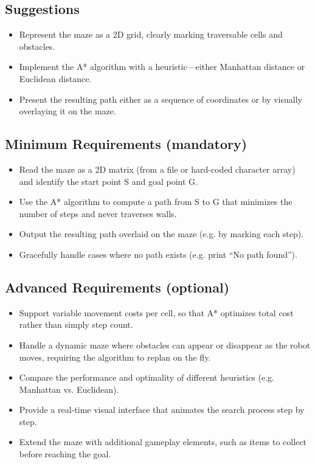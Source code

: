 \documentclass[a4paper,12pt]{article}
\begin{document}
\subsection*{Suggestions}
\begin{itemize}[noitemsep]
  \item Represent the maze as a 2D grid, clearly marking traversable cells and obstacles.
  \item Implement the A* algorithm with a heuristic—either Manhattan distance or Euclidean distance.
  \item Present the resulting path either as a sequence of coordinates or by visually overlaying it on the maze.
\end{itemize}

\subsection*{Minimum Requirements (mandatory)}
\begin{itemize}[noitemsep]
  \item Read the maze as a 2D matrix (from a file or hard-coded character array) and identify the start point S and goal point G.
  \item Use the A* algorithm to compute a path from S to G that minimizes the number of steps and never traverses walls.
  \item Output the resulting path overlaid on the maze (e.g. by marking each step).
  \item Gracefully handle cases where no path exists (e.g. print “No path found”).
\end{itemize}

\subsection*{Advanced Requirements (optional)}
\begin{itemize}[noitemsep]
  \item Support variable movement costs per cell, so that A* optimizes total cost rather than simply step count.
  \item Handle a dynamic maze where obstacles can appear or disappear as the robot moves, requiring the algorithm to replan on the fly.
  \item Compare the performance and optimality of different heuristics (e.g. Manhattan vs. Euclidean).
  \item Provide a real-time visual interface that animates the search process step by step.
  \item Extend the maze with additional gameplay elements, such as items to collect before reaching the goal.
\end{itemize}
\end{document}
